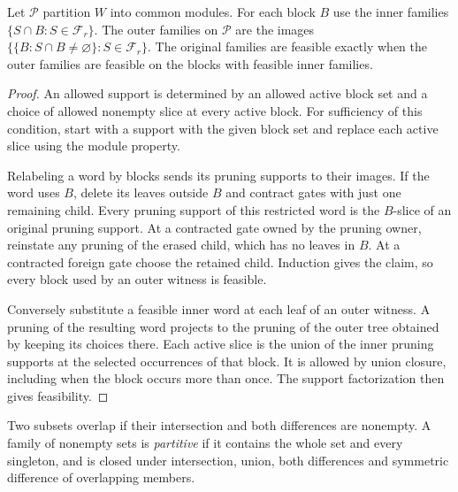 \begin{theorem}
\label{core:thm:pruning-module-factor}
Let $\mathcal P$ partition $W$ into common modules. For each block
$B$ use the inner families $\{S\cap B:S\in\mathcal F_r\}$. The
outer families on $\mathcal P$ are the images
$\{\{B:S\cap B\ne\varnothing\}:S\in\mathcal F_r\}$.
The original families are feasible exactly when the outer families
are feasible on the blocks with feasible inner families.
\end{theorem}
\begin{proof}
An allowed support is determined by an allowed active block set
and a choice of allowed nonempty slice at every active block.
For sufficiency of this condition, start with a support with the given
block set and replace each active slice using the module property.

Relabeling a word by blocks sends its pruning supports to their
images. If the word uses $B$, delete its leaves outside $B$ and
contract gates with just one remaining child. Every pruning support
of this restricted word is the $B$-slice of an original pruning
support. At a contracted gate owned by the pruning owner, reinstate
any pruning of the erased child, which has no leaves in $B$. At
a contracted foreign gate choose the retained child. Induction
gives the claim, so every block used by an outer witness is feasible.

Conversely substitute a feasible inner word at each leaf of an
outer witness. A pruning of the resulting word projects to the
pruning of the outer tree obtained by keeping its choices there.
Each active slice is the union of the inner pruning supports at
the selected occurrences of that block. It is allowed by union
closure, including when the block occurs more than once. The
support factorization then gives feasibility.
\end{proof}

Two subsets overlap if their intersection and both differences are
nonempty. A family of nonempty sets is \emph{partitive} if it contains
the whole set and every singleton, and is closed under intersection,
union, both differences and symmetric difference of overlapping
members.

